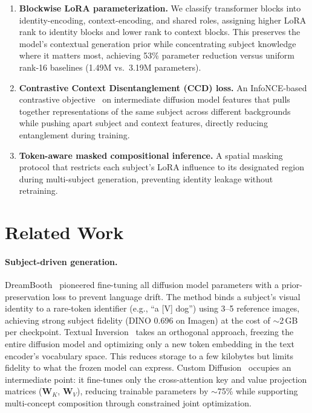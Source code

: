 \documentclass{article}
\begin{document}
\begin{enumerate}
\item \textbf{Blockwise LoRA parameterization.}
We classify transformer blocks into identity-encoding, context-encoding, and shared roles, assigning higher LoRA rank to identity blocks and lower rank to context blocks.
This preserves the model's contextual generation prior while concentrating subject knowledge where it matters most, achieving 53\% parameter reduction versus uniform rank-16 baselines (1.49M vs.\ 3.19M parameters).

\item \textbf{Contrastive Context Disentanglement (CCD) loss.}
An InfoNCE-based contrastive objective~\citep{oord2018infonce} on intermediate diffusion model features that pulls together representations of the same subject across different backgrounds while pushing apart subject and context features, directly reducing entanglement during training.

\item \textbf{Token-aware masked compositional inference.}
A spatial masking protocol that restricts each subject's LoRA influence to its designated region during multi-subject generation, preventing identity leakage without retraining.
\end{enumerate}

\section{Related Work}
\label{sec:related}

\paragraph{Subject-driven generation.}
DreamBooth~\citep{ruiz2023dreambooth} pioneered fine-tuning all diffusion model parameters with a prior-preservation loss to prevent language drift.
The method binds a subject's visual identity to a rare-token identifier (e.g., ``a [V] dog'') using 3--5 reference images, achieving strong subject fidelity (DINO 0.696 on Imagen) at the cost of $\sim$2\,GB per checkpoint.
Textual Inversion~\citep{gal2022textual} takes an orthogonal approach, freezing the entire diffusion model and optimizing only a new token embedding in the text encoder's vocabulary space.
This reduces storage to a few kilobytes but limits fidelity to what the frozen model can express.
Custom Diffusion~\citep{kumari2023custom} occupies an intermediate point: it fine-tunes only the cross-attention key and value projection matrices ($\mathbf{W}_K$, $\mathbf{W}_V$), reducing trainable parameters by $\sim$75\% while supporting multi-concept composition through constrained joint optimization.
\end{document}
